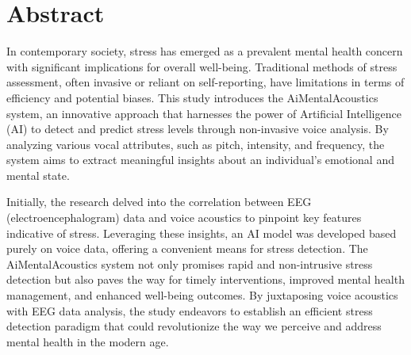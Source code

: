 \chapter*{\rm\bfseries Abstract}
\label{ch:abstraten}

In contemporary society, stress has emerged as a prevalent mental health concern with significant implications for overall well-being. Traditional methods of stress assessment, often invasive or reliant on self-reporting, have limitations in terms of efficiency and potential biases. This study introduces the AiMentalAcoustics system, an innovative approach that harnesses the power of Artificial Intelligence (AI) to detect and predict stress levels through non-invasive voice analysis. By analyzing various vocal attributes, such as pitch, intensity, and frequency, the system aims to extract meaningful insights about an individual's emotional and mental state.

Initially, the research delved into the correlation between EEG (electroencephalogram) data and voice acoustics to pinpoint key features indicative of stress. Leveraging these insights, an AI model was developed based purely on voice data, offering a convenient means for stress detection. The AiMentalAcoustics system not only promises rapid and non-intrusive stress detection but also paves the way for timely interventions, improved mental health management, and enhanced well-being outcomes. By juxtaposing voice acoustics with EEG data analysis, the study endeavors to establish an efficient stress detection paradigm that could revolutionize the way we perceive and address mental health in the modern age.

